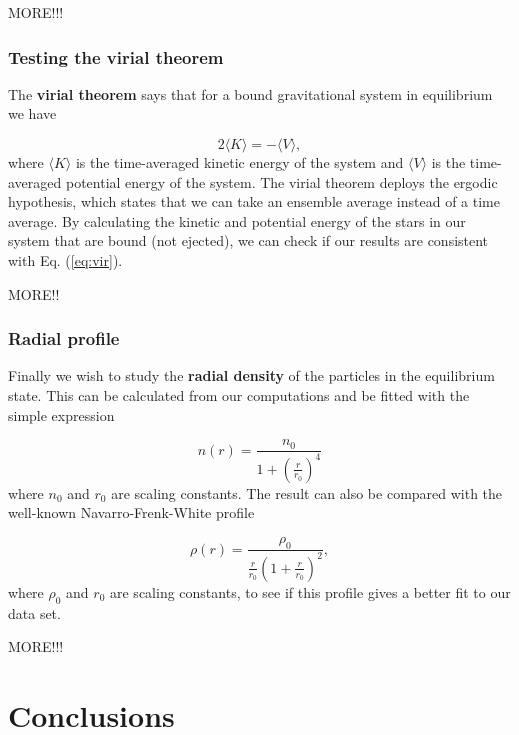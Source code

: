 \documentclass{article}
\begin{document}
\begin{multicols}{2}
MORE!!!




\subsubsection{Testing the virial theorem}

The \textbf{virial theorem} says that for a bound gravitational system in equilibrium we have

\begin{equation}\label{eq:vir}
	2 \langle K \rangle = - \langle V \rangle,
\end{equation}
where $\langle K \rangle$ is the time-averaged kinetic energy of the system and $\langle V \rangle$ is the time-averaged potential energy of the system. The virial theorem deploys the ergodic hypothesis, which states that we can take an ensemble average instead of a time average. By calculating the kinetic and potential energy of the stars in our system that are bound (not ejected), we can check if our results are consistent with Eq. (\ref{eq:vir}).

MORE!!



\subsubsection{Radial profile}

Finally we wish to study the \textbf{radial density} of the particles in the equilibrium state. This can be calculated from our computations and be fitted with the simple expression

\begin{equation}\label{eq:simple_fit}
	n(r) = \frac{n_0}{1 + (\frac{r}{r_0})^4}
\end{equation}
where $n_0$ and $r_0$ are scaling constants. The result can also be compared with the well-known Navarro-Frenk-White profile

\begin{equation}\label{eq:NFW}
	\rho(r) = \frac{\rho_0}{  \frac{r}{r_0} (1 + \frac{r}{r_0})^2  },
\end{equation}
where $\rho_0$ and $r_0$ are scaling constants, to see if this profile gives a better fit to our data set. 

MORE!!!






\section{Conclusions}


\end{multicols}
\end{document}
